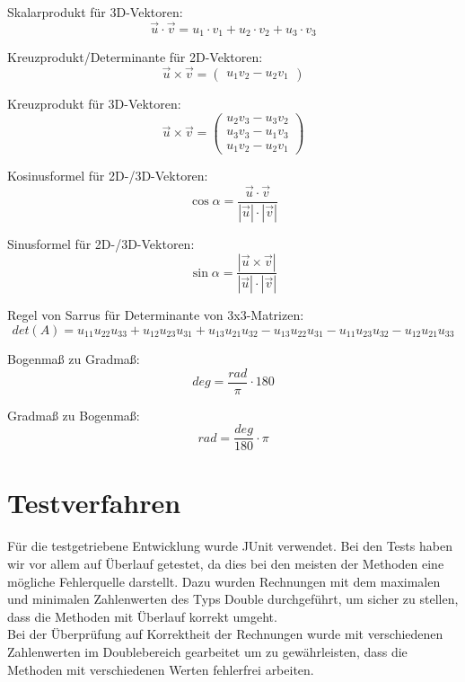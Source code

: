 \documentclass[a4paper,11pt]{scrartcl}
\begin{document}
Skalarprodukt für 3D-Vektoren:
\[ \vec u \cdot \vec v = u_1 \cdot v_1 + u_2 \cdot v_2 + u_3 \cdot v_3\]

Kreuzprodukt/Determinante für 2D-Vektoren:
\[ \vec u \times \vec v = \begin{pmatrix}
u_1v_2 - u_2v_1
\end{pmatrix}\]

Kreuzprodukt für 3D-Vektoren:
\[ \vec u \times \vec v = \begin{pmatrix}
u_2v_3 - u_3v_2\\
u_3v_3 - u_1v_3\\
u_1v_2 - u_2v_1
\end{pmatrix}\]

Kosinusformel für 2D-/3D-Vektoren:
\[ \cos \alpha = \frac{\vec u \cdot \vec v}{| \vec  u | \cdot | \vec  v | } \]

Sinusformel für 2D-/3D-Vektoren:
\[ \sin \alpha = \frac{ | \vec u \times \vec v | }{| \vec  u | \cdot | \vec  v | } \]

Regel von Sarrus für Determinante von 3x3-Matrizen:
\[ det(A) = u_{11}u_{22}u_{33} + u_{12}u_{23}u_{31} + u_{13}u_{21}u_{32} - u_{13}u_{22}u_{31} - u_{11}u_{23}u_{32} - u_{12}u_{21}u_{33} \]

Bogenmaß zu Gradmaß:
\[ deg = \frac{rad}{\pi} \cdot 180 \]

Gradmaß zu Bogenmaß:
\[ rad = \frac{deg}{180} \cdot \pi \]
\section{Testverfahren}
Für die testgetriebene Entwicklung wurde JUnit verwendet. Bei den Tests haben wir vor allem auf Überlauf getestet, da dies bei den meisten der Methoden eine mögliche Fehlerquelle darstellt. Dazu wurden Rechnungen mit dem maximalen und minimalen Zahlenwerten des Typs Double durchgeführt, um sicher zu stellen, dass die Methoden mit Überlauf korrekt umgeht. 
\\
Bei der Überprüfung auf Korrektheit der Rechnungen wurde mit verschiedenen Zahlenwerten im Doublebereich gearbeitet um zu gewährleisten, dass die Methoden mit verschiedenen Werten fehlerfrei arbeiten. 
\end{document}
